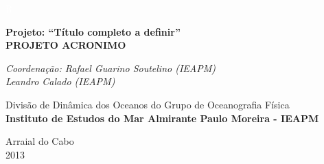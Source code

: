 \documentclass[12pt,portuguese,a4paper,pdftex]{article}
\renewcommand{\baselinestretch}{1.5}
\begin{document}
\begin{titlepage}

\textcolor{white}{R}


\begin{center}
{\LARGE {\bf \sc Projeto: ``Título completo a definir''}}\\
\vspace{2cm}
{\LARGE \bf PROJETO ACRONIMO}

\vspace{4cm}

{\Large \it Coordenação: Rafael Guarino Soutelino (IEAPM)\\
Leandro Calado (IEAPM)}

\end{center}


\vspace{3cm}

\begin{center}

 {\large  Divisão de Dinâmica dos Oceanos do Grupo de Oceanografia Física\\
 {\bf Instituto de Estudos do Mar Almirante Paulo Moreira - IEAPM}}

\end{center}


\renewcommand{\baselinestretch}{1.2}

\vspace{1.65in}

\vspace{1cm}

\begin{center}
{\large Arraial do Cabo}\\
{\large 2013}
\end{center}


\end{titlepage}

\newpage
\pagestyle{empty}
\tableofcontents



\end{document}
